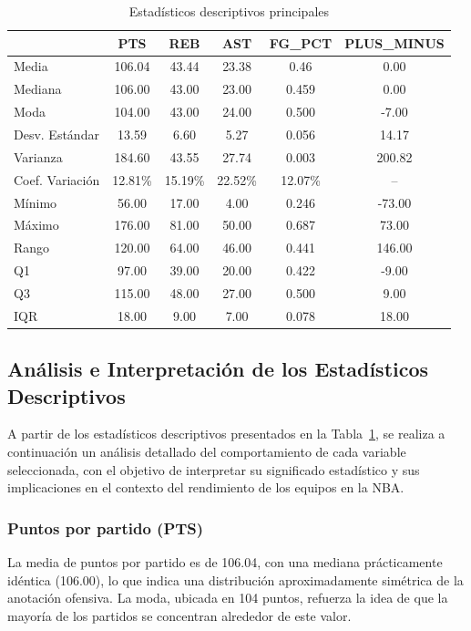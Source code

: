 \documentclass[12pt]{article}
\begin{document}
\begin{table}[H]
\centering
\small
\caption{Estadísticos descriptivos principales}
\label{tab:estadisticos_descriptivos}
\begin{tabular}{|l|c|c|c|c|c|}
\toprule
 & \textbf{PTS} & \textbf{REB} & \textbf{AST} & \textbf{FG\_PCT} & \textbf{PLUS\_MINUS} \\
\midrule
Media & 106.04 & 43.44 & 23.38 & 0.46 & 0.00 \\
Mediana & 106.00 & 43.00 & 23.00 & 0.459 & 0.00 \\
Moda & 104.00 & 43.00 & 24.00 & 0.500 & -7.00 \\
Desv. Estándar & 13.59 & 6.60 & 5.27 & 0.056 & 14.17 \\
Varianza & 184.60 & 43.55 & 27.74 & 0.003 & 200.82 \\
Coef. Variación & 12.81\% & 15.19\% & 22.52\% & 12.07\% & -- \\
Mínimo & 56.00 & 17.00 & 4.00 & 0.246 & -73.00 \\
Máximo & 176.00 & 81.00 & 50.00 & 0.687 & 73.00 \\
Rango & 120.00 & 64.00 & 46.00 & 0.441 & 146.00 \\
Q1 & 97.00 & 39.00 & 20.00 & 0.422 & -9.00 \\
Q3 & 115.00 & 48.00 & 27.00 & 0.500 & 9.00 \\
IQR & 18.00 & 9.00 & 7.00 & 0.078 & 18.00 \\
\bottomrule
\end{tabular}
\end{table}


\subsection{Análisis e Interpretación de los Estadísticos Descriptivos}

A partir de los estadísticos descriptivos presentados en la Tabla~\ref{tab:estadisticos_descriptivos},
se realiza a continuación un análisis detallado del comportamiento de cada variable seleccionada,
con el objetivo de interpretar su significado estadístico y sus implicaciones en el contexto del
rendimiento de los equipos en la NBA.

\subsubsection*{Puntos por partido (PTS)}

La media de puntos por partido es de 106.04, con una mediana prácticamente idéntica (106.00),
lo que indica una distribución aproximadamente simétrica de la anotación ofensiva. La moda,
ubicada en 104 puntos, refuerza la idea de que la mayoría de los partidos se concentran alrededor
de este valor.
\end{document}
